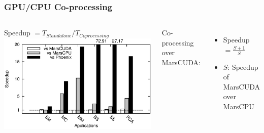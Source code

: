\begin{frame}
\frametitle{GPU/CPU Co-processing}
\begin{columns}
\begin{block}{Speedup $= T_{Standalone}/T_{Coprocessing} $}
\includegraphics[width=1.0\textwidth]{figure/coprocess.eps}
\end{block}
Co-processing over MarsCUDA:
\begin{itemize}
\item Speedup $= \frac{S+1}{S}$
\item $S$: Speedup of MarsCUDA over MarsCPU
\end{itemize}
\end{columns}
\end{frame}

